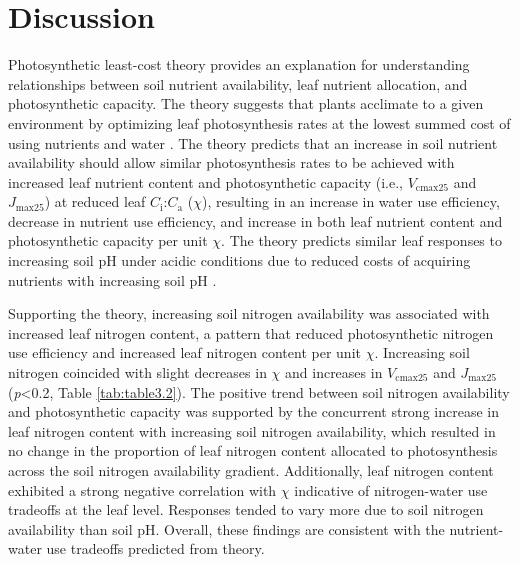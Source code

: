 \section{Discussion}
\noindent Photosynthetic least-cost theory provides an explanation for understanding relationships between soil nutrient availability, leaf nutrient allocation, and photosynthetic capacity. The theory suggests that plants acclimate to a given environment by optimizing leaf photosynthesis rates at the lowest summed cost of using nutrients and water . The theory predicts that an increase in soil nutrient availability should allow similar photosynthesis rates to be achieved with increased leaf nutrient content and photosynthetic capacity (i.e., $V_\mathrm{cmax25}$ and $J_\mathrm{max25}$) at reduced leaf $C_\mathrm{i}$:$C_\mathrm{a}$ ($\chi$), resulting in an increase in water use efficiency, decrease in nutrient use efficiency, and increase in both leaf nutrient content and photosynthetic capacity per unit $\chi$. The theory predicts similar leaf responses to increasing soil pH under acidic conditions due to reduced costs of acquiring nutrients with increasing soil pH .
    
Supporting the theory, increasing soil nitrogen availability was associated with increased leaf nitrogen content, a pattern that reduced photosynthetic nitrogen use efficiency and increased leaf nitrogen content per unit $\chi$. Increasing soil nitrogen coincided with slight decreases in $\chi$ and increases in $V_\mathrm{cmax25}$ and $J_\mathrm{max25}$ (\textit{p}<0.2, Table \ref{tab:table3.2}). The positive trend between soil nitrogen availability and photosynthetic capacity was supported by the concurrent strong increase in leaf nitrogen content with increasing soil nitrogen availability, which resulted in no change in the proportion of leaf nitrogen content allocated to photosynthesis across the soil nitrogen availability gradient. Additionally, leaf nitrogen content exhibited a strong negative correlation with $\chi$ indicative of nitrogen-water use tradeoffs at the leaf level. Responses tended to vary more due to soil nitrogen availability than soil pH. Overall, these findings are consistent with the nutrient-water use tradeoffs predicted from theory.

